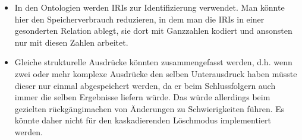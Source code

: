 \begin{itemize}
  \item In den Ontologien werden IRIs zur Identifizierung verwendet. Man könnte hier den Speicherverbrauch reduzieren, in dem man die IRIs in einer gesonderten Relation ablegt, sie dort mit Ganzzahlen kodiert und ansonsten nur mit diesen Zahlen arbeitet.
  \item Gleiche strukturelle Ausdrücke könnten zusammengefasst werden, d.h. wenn zwei oder mehr komplexe Ausdrücke den selben Unterausdruck haben müsste dieser nur einmal abgespeichert werden, da er beim Schlussfolgern auch immer die selben Ergebnisse liefern würde. Das würde allerdings beim gezielten rückgängimachen von Änderungen zu Schwierigkeiten führen. Es könnte daher nicht für den kaskadierenden Löschmodus implementiert werden.
\end{itemize}